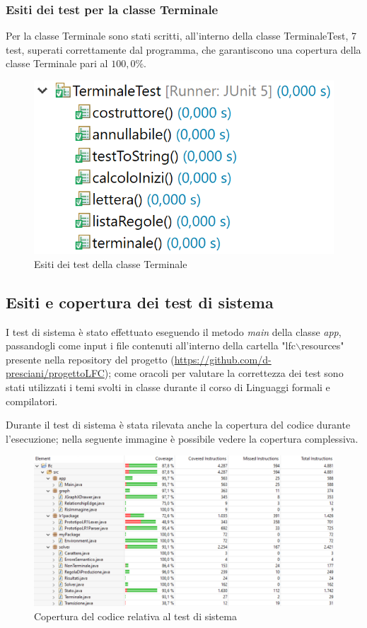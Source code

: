 \documentclass[12pt]{article}
\begin{document}
\subsubsection{Esiti dei test per la classe Terminale}
Per la classe Terminale sono stati scritti, all'interno della classe TerminaleTest, 7 test, superati correttamente dal programma, che garantiscono una copertura della classe Terminale pari al $100,0\%$.
\begin{figure}[h]
\centering
\includegraphics[scale=0.4]{immagini/esitiTerminaleTest.png}
\caption{Esiti dei test della classe Terminale}
\end{figure}
\pagebreak
\subsection{Esiti e copertura dei test di sistema}
I test di sistema è stato effettuato eseguendo il metodo \textit{main} della classe \textit{app}, passandogli come input i file contenuti all'interno della cartella "lfc$\backslash$resources" presente nella repository del progetto (\url{https://github.com/d-presciani/progettoLFC}); come oracoli per valutare la correttezza dei test sono stati utilizzati i temi svolti in classe durante il corso di Linguaggi formali e compilatori. \par
Durante il test di sistema è stata rilevata anche la copertura del codice durante l'esecuzione; nella seguente immagine è possibile vedere la copertura complessiva.
\begin{figure}[h]
\centering
\includegraphics[width=\textwidth]{immagini/coverage.png}
\caption{Copertura del codice relativa al test di sistema}
\end{figure}
\end{document}
